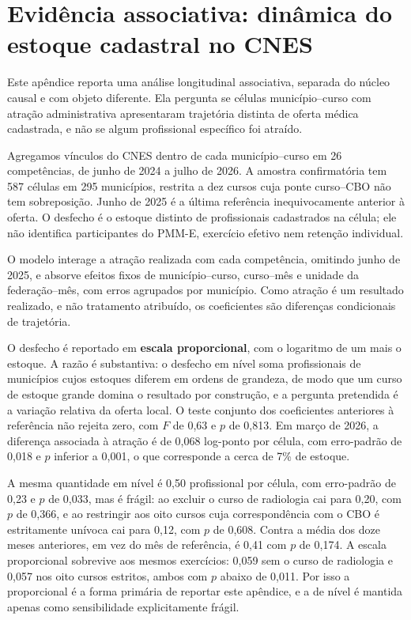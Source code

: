 \documentclass[11pt,a4paper]{article}
\begin{document}
\section{Evidência associativa: dinâmica do estoque cadastral no CNES}
\label{sec:cnes}

Este apêndice reporta uma análise longitudinal associativa, separada do núcleo
causal e com objeto diferente. Ela pergunta se células município--curso com
atração administrativa apresentaram trajetória distinta de oferta médica
cadastrada, e não se algum profissional específico foi atraído.

Agregamos vínculos do CNES dentro de cada município--curso em 26 competências, de
junho de 2024 a julho de 2026. A amostra confirmatória tem 587 células em 295
municípios, restrita a dez cursos cuja ponte curso--CBO não tem sobreposição.
Junho de 2025 é a última referência inequivocamente anterior à oferta. O desfecho
é o estoque distinto de profissionais cadastrados na célula; ele não identifica
participantes do PMM-E, exercício efetivo nem retenção individual.

O modelo interage a atração realizada com cada competência, omitindo junho de
2025, e absorve efeitos fixos de município--curso, curso--mês e unidade da
federação--mês, com erros agrupados por município. Como atração é um resultado
realizado, e não tratamento atribuído, os coeficientes são diferenças
condicionais de trajetória.

O desfecho é reportado em \textbf{escala proporcional}, com o logaritmo de um mais o
estoque. A razão é substantiva: o desfecho em nível soma profissionais de
municípios cujos estoques diferem em ordens de grandeza, de modo que um curso de
estoque grande domina o resultado por construção, e a pergunta pretendida é a
variação relativa da oferta local. O teste conjunto dos coeficientes anteriores à
referência não rejeita zero, com $F$ de 0,63 e $p$ de 0,813. Em março de 2026, a
diferença associada à atração é de 0,068 log-ponto por célula, com erro-padrão de
0,018 e $p$ inferior a 0,001, o que corresponde a cerca de 7\% de estoque.

A mesma quantidade em nível é 0,50 profissional por célula, com erro-padrão de
0,23 e $p$ de 0,033, mas é frágil: ao excluir o curso de radiologia cai para 0,20,
com $p$ de 0,366, e ao restringir aos oito cursos cuja correspondência com o CBO é
estritamente unívoca cai para 0,12, com $p$ de 0,608. Contra a média dos doze
meses anteriores, em vez do mês de referência, é 0,41 com $p$ de 0,174. A escala
proporcional sobrevive aos mesmos exercícios: 0,059 sem o curso de radiologia e
0,057 nos oito cursos estritos, ambos com $p$ abaixo de 0,011. Por isso a
proporcional é a forma primária de reportar este apêndice, e a de nível é mantida
apenas como sensibilidade explicitamente frágil.
\end{document}
